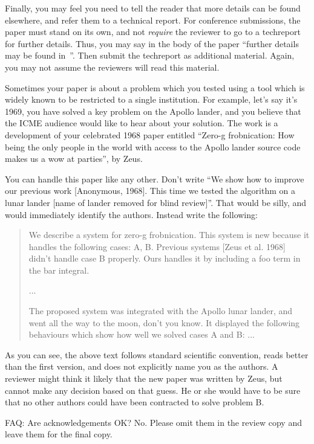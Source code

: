 \documentclass{article}
\begin{document}
Finally, you may feel you need to tell the reader that more details can be found elsewhere, and refer them to a technical report. For conference
submissions, the paper must stand on its own, and not {\em require} the reviewer to go to a techreport for further details. Thus, you may say in
the body of the paper ``further details may be found in~\cite{Authors12b}''.  Then submit the techreport as additional material. Again, you may not assume the reviewers will read this material.

Sometimes your paper is about a problem which you tested using a tool which is widely known to be restricted to a single institution.  For example, let's say it's 1969, you have solved a key problem on the Apollo lander, and you believe that the ICME audience would like to hear about your solution.  The work is a development of your celebrated 1968 paper entitled ``Zero-g frobnication: How being the only people in the world with access to the Apollo lander source code makes us a wow at parties'', by Zeus.

You can handle this paper like any other.  Don't write ``We show how to improve our previous work [Anonymous, 1968].  This time we tested the algorithm on a lunar lander [name of lander removed for blind review]''. That would be silly, and would immediately identify the authors. Instead write the following:
\begin{quotation}
\noindent
   We describe a system for zero-g frobnication.  This
   system is new because it handles the following cases:
   A, B.  Previous systems [Zeus et al. 1968] didn't
   handle case B properly.  Ours handles it by including
   a foo term in the bar integral.

   ...

   The proposed system was integrated with the Apollo
   lunar lander, and went all the way to the moon, don't
   you know.  It displayed the following behaviours
   which show how well we solved cases A and B: ...
\end{quotation}

As you can see, the above text follows standard scientific convention, reads better than the first version, and does not explicitly name you as the authors. A reviewer might think it likely that the new paper was written by Zeus, but cannot make any decision based on that guess. He or she would have to be sure that no other authors could have been contracted to solve problem B.

FAQ: Are acknowledgements OK?  No. Please omit them in the review copy and leave them for the final copy.
\end{document}
